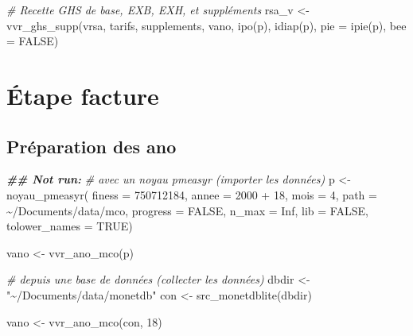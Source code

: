 \documentclass[
]{book}
\newenvironment{Shaded}{\begin{snugshade}}{\end{snugshade}}
\newcommand{\AttributeTok}[1]{\textcolor[rgb]{0.77,0.63,0.00}{#1}}
\newcommand{\CommentTok}[1]{\textcolor[rgb]{0.56,0.35,0.01}{\textit{#1}}}
\newcommand{\ConstantTok}[1]{\textcolor[rgb]{0.00,0.00,0.00}{#1}}
\newcommand{\DecValTok}[1]{\textcolor[rgb]{0.00,0.00,0.81}{#1}}
\newcommand{\DocumentationTok}[1]{\textcolor[rgb]{0.56,0.35,0.01}{\textbf{\textit{#1}}}}
\newcommand{\FunctionTok}[1]{\textcolor[rgb]{0.00,0.00,0.00}{#1}}
\newcommand{\NormalTok}[1]{#1}
\newcommand{\OtherTok}[1]{\textcolor[rgb]{0.56,0.35,0.01}{#1}}
\newcommand{\SpecialCharTok}[1]{\textcolor[rgb]{0.00,0.00,0.00}{#1}}
\newcommand{\StringTok}[1]{\textcolor[rgb]{0.31,0.60,0.02}{#1}}
\begin{document}
\begin{Shaded}
\begin{Highlighting}[]
\CommentTok{\# Recette GHS de base, EXB, EXH, et suppléments}
\NormalTok{rsa\_v }\OtherTok{\textless{}{-}} \FunctionTok{vvr\_ghs\_supp}\NormalTok{(vrsa, tarifs, supplements, vano, }\FunctionTok{ipo}\NormalTok{(p), }\FunctionTok{idiap}\NormalTok{(p), }\AttributeTok{pie =} \FunctionTok{ipie}\NormalTok{(p), }\AttributeTok{bee =} \ConstantTok{FALSE}\NormalTok{)}
\end{Highlighting}
\end{Shaded}

\hypertarget{uxe9tape-facture}{%
\section{Étape facture}\label{uxe9tape-facture}}

\hypertarget{pruxe9paration-des-ano}{%
\subsection{Préparation des ano}\label{pruxe9paration-des-ano}}

\begin{Shaded}
\begin{Highlighting}[]
\DocumentationTok{\#\# Not run: }
\CommentTok{\# avec un noyau pmeasyr (importer les données)}
\NormalTok{p }\OtherTok{\textless{}{-}} \FunctionTok{noyau\_pmeasyr}\NormalTok{(}
  \AttributeTok{finess   =} \StringTok{\textquotesingle{}750712184\textquotesingle{}}\NormalTok{,}
  \AttributeTok{annee    =} \DecValTok{2000} \SpecialCharTok{+} \DecValTok{18}\NormalTok{,}
  \AttributeTok{mois     =} \DecValTok{4}\NormalTok{,}
  \AttributeTok{path     =} \StringTok{\textquotesingle{}\textasciitilde{}/Documents/data/mco\textquotesingle{}}\NormalTok{,}
  \AttributeTok{progress =} \ConstantTok{FALSE}\NormalTok{,}
  \AttributeTok{n\_max    =} \ConstantTok{Inf}\NormalTok{,}
  \AttributeTok{lib      =} \ConstantTok{FALSE}\NormalTok{,}
  \AttributeTok{tolower\_names =} \ConstantTok{TRUE}\NormalTok{)}

\NormalTok{vano }\OtherTok{\textless{}{-}} \FunctionTok{vvr\_ano\_mco}\NormalTok{(p)}

\CommentTok{\# depuis une base de données (collecter les données)}
\NormalTok{dbdir }\OtherTok{\textless{}{-}} \StringTok{"\textasciitilde{}/Documents/data/monetdb"}
\NormalTok{con }\OtherTok{\textless{}{-}} \FunctionTok{src\_monetdblite}\NormalTok{(dbdir)}

\NormalTok{vano }\OtherTok{\textless{}{-}} \FunctionTok{vvr\_ano\_mco}\NormalTok{(con, }\DecValTok{18}\NormalTok{)}
\end{Highlighting}
\end{Shaded}
\end{document}
